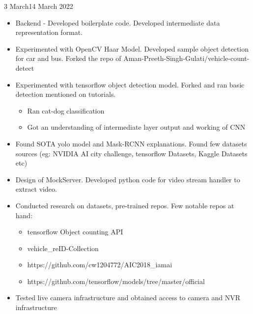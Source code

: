 \documentclass{diaryformat}
\begin{document}
\begin{workDone}{3 March}{14 March 2022}
	\begin{itemize}
		\item Backend - Developed boilerplate code. Developed intermediate data representation format.
		\item Experimented with OpenCV Haar Model. Developed sample object detection for car and bus. Forked the repo of Aman-Preeth-Singh-Gulati/vehicle-count-detect
		\item Experimented with tensorflow object detection model. Forked and ran basic detection mentioned on tutorials.
		\begin{itemize}
			\item Ran cat-dog classification
			\item Got an understanding of intermediate layer output and working of CNN
		\end{itemize}
		\item Found SOTA yolo model and Mask-RCNN explanations. Found few datasets sources (eg: NVIDIA AI city challenge, tensorflow Datasets, Kaggle Datasets etc)
		\item Design of MockServer. Developed python code for video stream handler to extract video.
		\item Conducted research on datasets, pre-trained repos. Few notable repos at hand:
		\begin{itemize}
			\item tensorflow Object counting API
			\item vehicle\_reID-Collection
			\item https://github.com/cw1204772/AIC2018\_iamai
			\item https://github.com/tensorflow/models/tree/master/official
		\end{itemize}
		\item Tested live camera infrastructure and obtained access to camera and NVR infrastructure
	\end{itemize}

\end{workDone}
\end{document}
